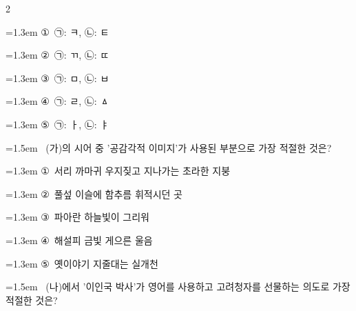 \documentclass[10pt, a4paper]{article}
\begin{document}
\begin{multicols}{2}
\begin{minipage}{\columnwidth}
\vspace{0.5mm}
{\hangindent=1.3em  \noindent\hspace{0.3em}①~㉠: ㅋ, ㉡: ㅌ\par}
{\hangindent=1.3em  \noindent\hspace{0.3em}②~㉠: ㄲ, ㉡: ㄸ\par}
{\hangindent=1.3em  \noindent\hspace{0.3em}③~㉠: ㅁ, ㉡: ㅂ\par}
{\hangindent=1.3em  \noindent\hspace{0.3em}④~㉠: ㄹ, ㉡: ㅿ\par}
{\hangindent=1.3em  \noindent\hspace{0.3em}⑤~㉠: ㅏ, ㉡: ㅑ\par}
\vspace{4mm}
\end{minipage}
\par

\noindent\begin{minipage}{\columnwidth}
\vspace{2mm}
{\hangindent=1.5em  ~(가)의 시어 중 '공감각적 이미지'가 사용된 부분으로 가장 적절한 것은?\par}

\vspace{0.5mm}
{\hangindent=1.3em  \noindent\hspace{0.3em}①~서리 까마귀 우지짖고 지나가는 초라한 지붕\par}
{\hangindent=1.3em  \noindent\hspace{0.3em}②~풀섶 이슬에 함추름 휘적시던 곳\par}
{\hangindent=1.3em  \noindent\hspace{0.3em}③~파아란 하늘빛이 그리워\par}
{\hangindent=1.3em  \noindent\hspace{0.3em}④~해설피 금빛 게으른 울음\par}
{\hangindent=1.3em  \noindent\hspace{0.3em}⑤~옛이야기 지줄대는 실개천\par}
\vspace{4mm}
\end{minipage}
\par

\noindent\begin{minipage}{\columnwidth}
\vspace{2mm}
{\hangindent=1.5em  ~(나)에서 '이인국 박사'가 영어를 사용하고 고려청자를 선물하는 의도로 가장 적절한 것은?\par}


\end{minipage}
\end{multicols}
\end{document}
